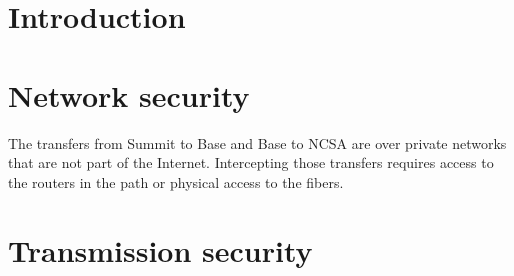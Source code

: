 \section{Introduction} \label{sec:intro}


\section{Network security}\label{sec:net}

The transfers from Summit to Base and Base to NCSA are over private networks that are not part of the Internet.  Intercepting those transfers requires access to the routers in the path or physical access to the fibers.


\section{Transmission security} \label{sec:trans}
